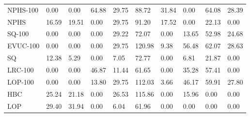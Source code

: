 \begin{table}
\begin{tabular}{lp{1.2cm}p{1.2cm}p{1.2cm}p{1.2cm}p{1.2cm}p{1.2cm}p{1.2cm}p{1.2cm}p{1.2cm}}
NPHS-100 &      0.00 &      0.00 &                 64.88 &             29.75 &         88.72 &            31.84 &       0.00 &       64.08 &       28.39 \\
NPHS     &     16.59 &     19.51 &                  0.00 &             29.75 &         91.20 &            17.52 &       0.00 &       22.13 &        0.00 \\
SQ-100   &      0.00 &      0.00 &                  0.00 &             29.22 &         72.07 &             0.00 &      13.65 &       52.98 &       24.68 \\
EVUC-100 &      0.00 &      0.00 &                  0.00 &             29.75 &        120.98 &             9.38 &      56.48 &       62.07 &       28.63 \\
SQ       &     12.38 &      5.29 &                  0.00 &              7.05 &         72.77 &             0.00 &       6.81 &       21.87 &        0.00 \\
LRC-100  &      0.00 &      0.00 &                 46.87 &             11.44 &         61.65 &             0.00 &      35.28 &       57.41 &        0.00 \\
LOP-100  &      0.00 &      0.00 &                 13.80 &             29.75 &        112.03 &             3.66 &      46.17 &       59.91 &       27.80 \\
HBC      &     25.24 &     21.18 &                  0.00 &             26.53 &        115.86 &             0.00 &      15.96 &        0.00 &        0.00 \\
LOP      &     29.40 &     31.94 &                  0.00 &              6.04 &         61.96 &             0.00 &       0.00 &        0.00 &        0.00 \\
\bottomrule
\end{tabular}
\end{table}
